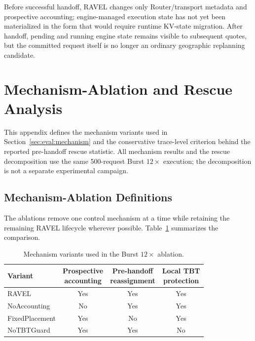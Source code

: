 \documentclass[letterpaper,twocolumn,10pt]{article}
\begin{document}
Before successful handoff, RAVEL changes only Router/transport metadata and
prospective accounting; engine-managed execution state has not yet been
materialized in the form that would require runtime KV-state migration.
After handoff, pending and running engine state remains visible to subsequent
quotes, but the committed request itself is no longer an ordinary geographic
replanning candidate.


\section{Mechanism-Ablation and Rescue Analysis}
\label{app:mechanism-analysis}

This appendix defines the mechanism variants used in
Section~\ref{sec:eval:mechanism} and the conservative trace-level criterion
behind the reported pre-handoff rescue statistic.
All mechanism results and the rescue decomposition use the same 500-request
Burst $12\times$ execution; the decomposition is not a separate experimental
campaign.


\subsection{Mechanism-Ablation Definitions}
\label{sec:appendix:mechanism-ablations}

The ablations remove one control mechanism at a time while retaining the
remaining RAVEL lifecycle wherever possible.
Table~\ref{tab:appendix:mechanism-ablations} summarizes the comparison.

\begin{table}[t]
    \centering
    \small
    \caption{Mechanism variants used in the Burst $12\times$ ablation.}
    \label{tab:appendix:mechanism-ablations}
    \setlength{\tabcolsep}{3.5pt}
    \renewcommand{\arraystretch}{1.10}
    \begin{tabular}{@{}lccc@{}}
        \toprule
        \textbf{Variant} &
        \makecell{\textbf{Prospective}\\\textbf{accounting}} &
        \makecell{\textbf{Pre-handoff}\\\textbf{reassignment}} &
        \makecell{\textbf{Local TBT}\\\textbf{protection}} \\
        \midrule
        RAVEL          & Yes & Yes & Yes \\
        NoAccounting   & No  & Yes & Yes \\
        FixedPlacement & Yes & No  & Yes \\
        NoTBTGuard     & Yes & Yes & No  \\
        \bottomrule
    \end{tabular}
\end{table}
\end{document}
